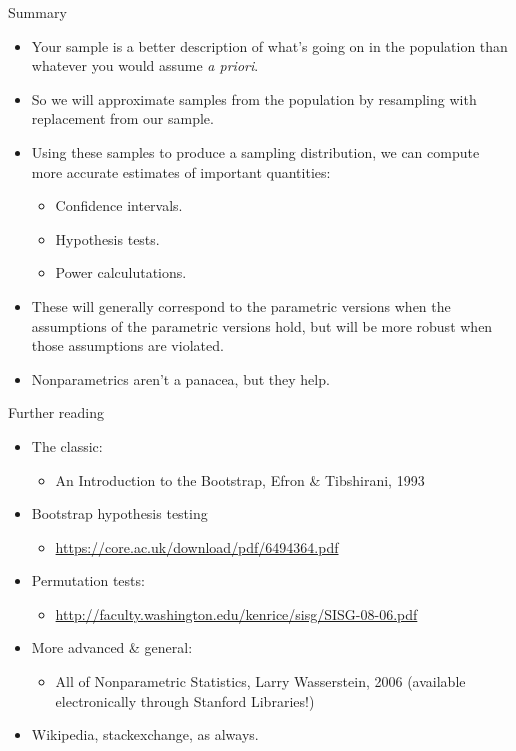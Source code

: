 \documentclass{beamer} %
\begin{document}
\begin{frame}{Summary}
\begin{itemize}
\item Your sample is a better description of what's going on in the population than whatever you would assume \textit{a priori}.
\item So we will approximate samples from the population by resampling with replacement from our sample.
\item Using these samples to produce a sampling distribution, we can compute more accurate estimates of important quantities:%
    \begin{itemize}
    \item Confidence intervals.
    \item Hypothesis tests.
    \item Power calculutations.
    \end{itemize}
\item These will generally correspond to the parametric versions when the assumptions of the parametric versions hold, but will be more robust when those assumptions are violated.
\item Nonparametrics aren't a panacea, but they help. 
\end{itemize}
\end{frame}

\begin{frame}{Further reading}
\begin{itemize}
\item The classic:
    \begin{itemize}
    \item An Introduction to the Bootstrap, Efron \& Tibshirani, 1993
    \end{itemize}
\item Bootstrap hypothesis testing 
    \begin{itemize}
    \item \url{https://core.ac.uk/download/pdf/6494364.pdf} 
    \end{itemize}
\item Permutation tests:
    \begin{itemize}
    \item \url{http://faculty.washington.edu/kenrice/sisg/SISG-08-06.pdf} 
    \end{itemize}
\item More advanced \& general: 
    \begin{itemize}
    \item All of Nonparametric Statistics, Larry Wasserstein, 2006 (available electronically through Stanford Libraries!)
    \end{itemize}
\item Wikipedia, stackexchange, as always.
\end{itemize}
\end{frame}
\end{document}
